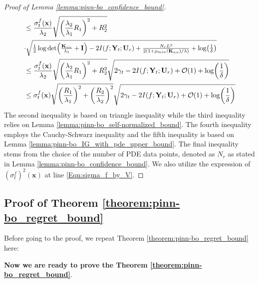 \begin{proof}[Proof of Lemma \ref{lemma:pinn-bo_confidence_bound}]
\begin{align*}
                 & \le \frac{\sigma_t^f(\mathbf{x})}{\lambda_2} \sqrt{\left(\frac{\lambda_2}{\lambda_1}R_1\right)^2 + R_2^2} \notag \\
                 & \resizebox{0.8\textwidth}{!}{$\cdot \sqrt{\frac{1}{2}\log\det (\frac{\mathbf{K}_{uu}}{\lambda_1} + \mathbf{I}) - 2 I(f; \mathbf{Y}_t; \mathbf{U}_r) + \frac{N_r L^2}{2(1+ \rho_{min}(\mathbf{K}_{uu})/\lambda)} + \log(\frac{1}{\delta})}$}
                 \\
                 & \le \frac{\sigma_t^f(\mathbf{x})}{\lambda_2} \sqrt{\left(\frac{\lambda_2}{\lambda_1}R_1\right)^2 + R_2^2} \sqrt{2\gamma_t - 2 I(f; \mathbf{Y}_t; \mathbf{U}_r) + \mathcal{O}(1) + \log(\frac{1}{\delta})} 
                 \\
                 & \le \sigma_t^f(\mathbf{x}) \sqrt{\left(\frac{R_1}{\lambda_1}\right)^2 + \left(\frac{R_2}{\lambda_2}\right)^2} \sqrt{2\gamma_t - 2 I(f; \mathbf{Y}_t; \mathbf{U}_r) + \mathcal{O}(1) + \log(\frac{1}{\delta})}
    \end{align*}
The second inequality is based on triangle inequality while the third inequality relies on Lemma \ref{lemma:pinn-bo_self-normalized_bound}. The fourth inequality employs the Cauchy-Schwarz inequality and the fifth inequality is based on Lemma \ref{lemma:pinn-bo_IG_with_pde_upper_bound}. The final inequality stems from the choice of the number of PDE data points, denoted as $N_r$ as stated in Lemma \ref{lemma:pinn-bo_confidence_bound}. We also utilize the expression of $\left(\sigma_t^f\right)^2(\mathbf{x})$ at line \eqref{Eqn:sigma_f_by_V}.
\end{proof}

\subsection{Proof of Theorem \ref{theorem:pinn-bo_regret_bound}}
Before going to the proof, we repeat Theorem \ref{theorem:pinn-bo_regret_bound} here:
\PINNBORegretBound*



\noindent \textbf{Now we are ready to prove the Theorem \ref{theorem:pinn-bo_regret_bound}}.

